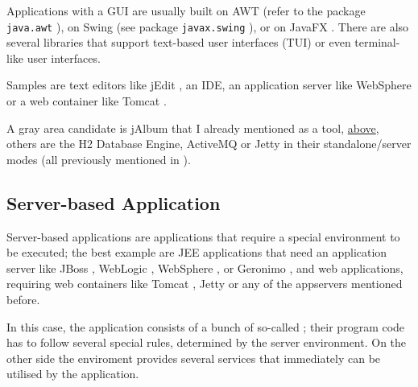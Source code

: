 Applications with a GUI are usually built on AWT (refer to the package \lstinline|java.awt| \autocite{ORACLE_DOC_AWT_PACKAGE}), on Swing (see package \lstinline|javax.swing| \autocite{ORACLE_DOC_SWING_PACKAGE}), or on JavaFX \autocite{JavaFX}. There are also several libraries that support text-based user interfaces (TUI) or even terminal-like user interfaces.

Samples are text editors like jEdit \autocite{JEDIT}, an IDE, an application server like WebSphere \autocite{IBM_WEBSPHERE} or a web container like Tomcat \autocite{APACHE_TOMCAT}.

A gray area candidate is jAlbum that I already mentioned as a tool, \hyperref[sec:Tool]{above}, others are the H2 Database Engine, ActiveMQ or Jetty in their standalone/server modes (all previously mentioned in ).


\subsection{Server-based Application}\label{sec:ServerbasedApplication}
Server-based applications are applications that require a special environment to be executed; the best example are JEE applications that need an application server like JBoss \autocite{REDHAT_JBOSS}, WebLogic \autocite{ORACLE_WEBLOGIC}, WebSphere \autocite{IBM_WEBSPHERE}, or Geronimo \autocite{APACHE_GERONIMO}, and web applications, requiring web containers like Tomcat \autocite{APACHE_TOMCAT}, Jetty \autocite{ECLIPSE_JETTY} or any of the appservers mentioned before.

In this case, the application consists of a bunch of so-called ; their program code has to follow several special rules, determined by the server environment. On the other side the enviroment provides several services that immediately can be utilised by the application.

